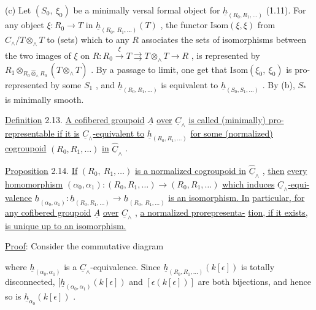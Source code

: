 (c)  Let $(S_0,\ \xi_0)$ be a minimally versal formal object for $\underline{h}_{(R_0,R_1,\ldots)}$ (1.11). For any object $\xi : R_0 \to T$ in $\underline{h}_{(R_0,\ R_1,\ldots)}(T)$ , the functor $\mathrm{Isom}(\xi,\xi)$ from $C_\wedge/T \otimes_\wedge T$ to (sets) which to any $R$ associates the sets of isomorphisms between the two images of $\xi$ on $R : R_0 \overset{\xi}{\longrightarrow} T \rightrightarrows T \otimes_\wedge T \longrightarrow R$ , is represented by $R_1 \otimes_{R_0 \hat{\otimes}_\wedge R_0} (T \hat{\otimes}_\wedge T)$ . By a passage to limit, one get that $\mathrm{Isom}(\xi_0,\ \xi_0)$ is pro-represented by some $S_1$ , and $\underline{h}_{(R_0,R_1,\ldots)}$ is equivalent to $\underline{h}_{(S_0,S_1,\ldots)}$ . By (b), $S_*$ is minimally smooth.

\underline{Definition} 2.13.  \underline{A cofibered groupoid} $\underline{A}$ \underline{over} $\underline{C}_\wedge$ \underline{is called (minimally) pro-representable if it is} $\underline{C}_\wedge$\underline{-equivalent to} $\underline{h}_{(R_0,R_1,\ldots)}$ \underline{for some (normalized) cogroupoid} $(R_0,R_1,\ldots)$ \underline{in} $\widehat{\underline{C}}_\wedge$ .

\underline{Proposition} 2.14.  \underline{If} $(R_0,\ R_1,\ldots)$ \underline{is a normalized cogroupoid in} $\widehat{\underline{C}}_\wedge$ , \underline{then} \underline{every homomorphism} $(\alpha_0,\alpha_1) : (R_0,R_1,\ldots) \to (R_0,R_1,\ldots)$ \underline{which induces} $\underline{C}_\wedge$\underline{-equi-} \underline{valence} $\underline{h}_{(\alpha_0,\alpha_1)} : \underline{h}_{(R_0,R_1,\ldots)} \longrightarrow \underline{h}_{(R_0,\ R_1,\ldots)}$ \underline{is an isomorphism. In}
\underline{particular, for any cofibered groupoid} $\underline{A}$ \underline{over} $\underline{C}_\wedge$ , \underline{a normalized prorepresenta-} \underline{tion, if it exists, is unique up to an isomorphism.}

\underline{Proof}:  Consider the commutative diagram

\begin{center}
\end{center}
where $\underline{h}_{(\alpha_0,\alpha_1)}$ is a $\underline{C}_\wedge$-equivalence. Since $\underline{h}_{(R_0,R_1,\ldots)}(k[\epsilon])$ is totally disconnected, $[\underline{h}_{(\alpha_0,\alpha_1)}(k[\epsilon])$ and $[\epsilon(k[\epsilon])]$ are both bijections, and hence so is $\underline{h}_{\alpha_0}(k[\epsilon])$ .

